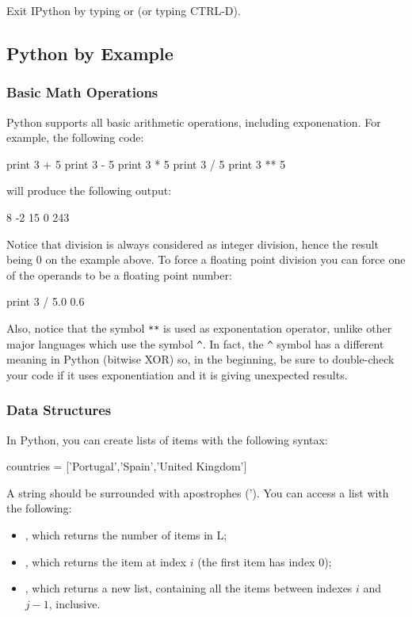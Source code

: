 Exit IPython by typing  or  (or typing CTRL-D).

\subsection{Python by Example}

\subsubsection{Basic Math Operations}

Python supports all basic arithmetic operations, including exponenation. For example, the following code:
\begin{python}
print 3 + 5
print 3 - 5
print 3 * 5
print 3 / 5
print 3 ** 5
\end{python}

\noindent will produce the following output:
\begin{python}
8
-2
15
0
243
\end{python}

Notice that division is always considered as integer division, hence the result being 0 on the example above. To force a floating point division you can force one of the operands to be a floating point number:
\begin{python}
print 3 / 5.0
0.6
\end{python}

Also, notice that the symbol \texttt{**} is used as exponentation operator, unlike other major languages which use the symbol \texttt{\^}. In fact, the \texttt{\^} symbol has a different meaning in Python (bitwise XOR) so, in the beginning, be sure to double-check your code if it uses exponentiation and it is giving unexpected results.

\subsubsection{Data Structures}

In Python, you can create lists of items with the following syntax:

\begin{python}
countries = ['Portugal','Spain','United Kingdom']
\end{python}

A string should be surrounded with apostrophes ('). You can access a list with
the following:

\begin{itemize}
 \item {}, which returns the number of items in L;
 \item {}, which returns the item at index $i$ (the first item has index 0);
 \item {}, which returns a new list, containing all the items between indexes $i$ and $j-1$, inclusive. 
\end{itemize}

